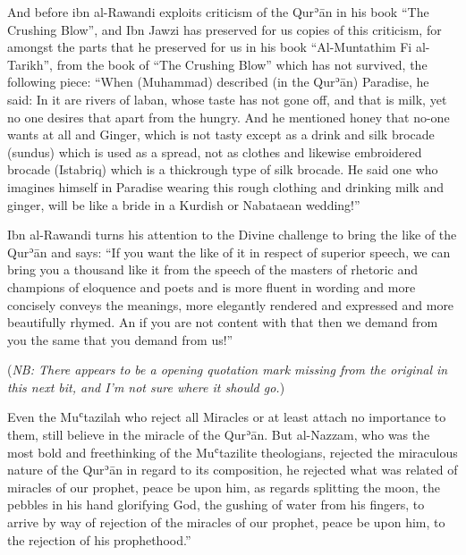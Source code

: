 \documentclass[12pt]{memoir}
\def\´{ʾ} %
\def\`{ʿ} %
\def \Quran{Qur\-\´ān} %
\let \Qrn=\Quran      %
\def\/{\discretionary{/}{}{/}}
\newcommand{\NB}[1]{\emph{\small NB: #1}}
\begin{document}

And before ibn al-Rawandi exploits criticism of the \Qrn{} in his book “The
Crushing Blow”, and Ibn Jawzi has preserved for us copies of this criticism,
for amongst the parts that he preserved for us in his book “Al-Muntathim Fi
al-Tarikh”, from the book of “The Crushing Blow” which has not survived, the
following piece: “When (Muhammad) described (in the \Quran) Paradise, he said:
In it are rivers of laban, whose taste has not gone off, and that is milk, yet
no one desires that apart from the hungry. And he mentioned honey that no-one
wants at all and Ginger, which is not tasty except as a drink and silk brocade
(sundus) which is used as a spread, not as clothes and likewise embroidered
brocade (Istabriq) which is a thick\/rough type of silk brocade.
He said one who
imagines himself in Paradise wearing this rough clothing and drinking milk and
ginger, will be like a bride in a Kurdish or Nabataean wedding!”\footnotemark


Ibn al-Rawandi turns his attention to the Divine challenge to bring the like of
the \Qrn{} and says: “If you want the like of it in respect of superior speech,
we can bring you a thousand like it from the speech of the masters of rhetoric
and champions of eloquence and poets and is more fluent in wording and more
concisely conveys the meanings, more elegantly rendered and expressed and more
beautifully rhymed. An if you are not content with that then we demand from you
the same that you demand from us!”\footnotemark


(\NB{There appears to be a opening quotation mark missing from the original in
this next bit, and I’m not sure where it should go.})

Even the Mu\`tazilah who reject all Miracles or at least attach no importance to
them, still believe in the miracle of the \Quran.\footnotemark\@
{}
But al-Nazzam, who was the most bold and freethinking of the Mu\`tazilite
theologians, rejected the miraculous nature of the \Qrn{} in regard to its
composition, he rejected what was related of miracles of our prophet, peace be
upon him, as regards splitting the moon, the pebbles in his hand glorifying
God, the gushing of water from his fingers, to arrive by way of rejection of
the miracles of our prophet, peace be upon him, to the rejection of his
prophethood.”\footnotemark
\end{document}
